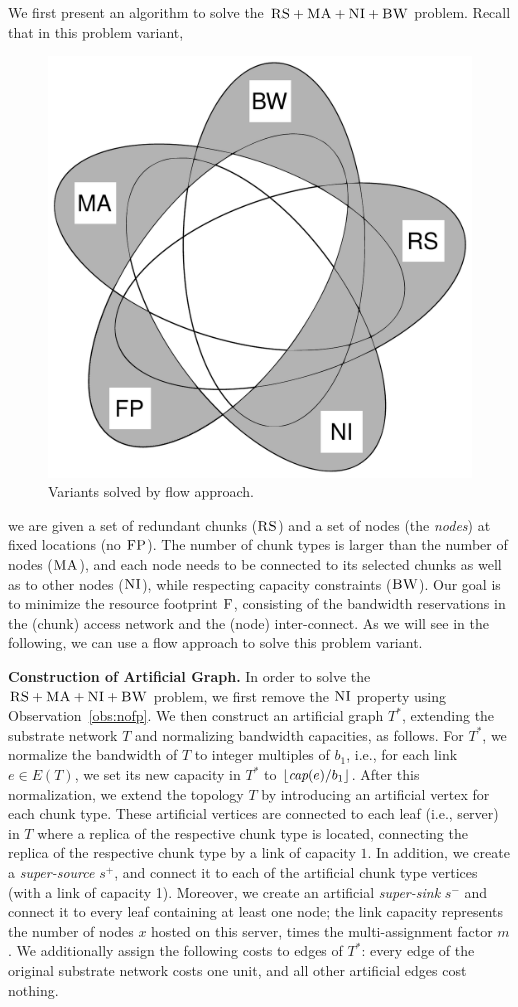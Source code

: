 \documentclass[conference,10pt]{IEEEtran}
\newcommand{\MaFactor}{m}
\newcommand{\Source}{\ensuremath{s^{+}}}
\newcommand{\Sink}{\ensuremath{s^{-}}}
\newcommand{\capacity}{\emph{cap}}
\newcommand{\CC}{\textsc{NI}}
\newcommand{\FP}{\textsc{FP}}
\newcommand{\RS}{\textsc{RS}}
\newcommand{\BW}{\textsc{BW}}
\newcommand{\MA}{\textsc{MA}}
\newcommand{\Cost}{\textsc{F}}
\newcommand{\Tree}{\ensuremath{T}}
\newcommand{\CostTrans}{\ensuremath{b_1}}
\begin{document}
We first present an algorithm to solve the $\RS+\MA+\CC+\BW$ problem.
Recall that in this problem variant,
\begin{figure}
\vspace{-1em}
\includegraphics[width=0.48\columnwidth]{figs/venn_flow.pdf}
\caption{Variants solved by flow approach.}
\vspace{-1em}
\label{fig:venn_flow}
\end{figure}
we are given a set of redundant chunks ($\RS$) and a set of
nodes
(the \emph{nodes})
at fixed locations (no $\FP$). The number of chunk types is larger than the number
of nodes ($\MA$), and each node needs to be connected
to its selected chunks as well as to other nodes ($\CC$), while respecting
capacity constraints ($\BW$).
Our goal is to minimize the resource footprint $\Cost$, consisting
of the bandwidth reservations in the (chunk) access network and the (node)
inter-connect.
As we will see in the following, we can use a flow approach to solve this
problem variant.




\textbf{Construction of Artificial Graph.}
In order to solve the $\RS+\MA+\CC+\BW$ problem,
we first remove the $\CC$ property using Observation~\ref{obs:nofp}.
We then construct
an artificial graph $\Tree^*$, extending the substrate network $\Tree$ and
normalizing bandwidth capacities, as follows. For $\Tree^*$,
we normalize the bandwidth of $\Tree$ to integer multiples of $\CostTrans$,
i.e., for each link $e\in E(\Tree)$, we set its new
capacity in $\Tree^*$ to $\lfloor\capacity(e)/\CostTrans\rfloor$.
After this normalization, we extend the topology $\Tree$ by
introducing an artificial vertex for each chunk type. These artificial
vertices are connected to each leaf (i.e., server) in $\Tree$ where a replica
 of the respective chunk type is located,
connecting the replica of the respective chunk type by a link of capacity $1$. In
addition, we create a
\emph{super-source} $\Source$, and connect it to each of the artificial chunk
type vertices (with a link of capacity 1). Moreover, we create an artificial \emph{super-sink} $\Sink$ and
connect it to every leaf containing at least one node; the link capacity represents
the number of nodes $x$ hosted on this server, times the multi-assignment factor
$\MaFactor$.
We additionally assign the following costs to edges of $\Tree^*$:
every edge of the original substrate network costs one unit, and all other artificial edges
cost nothing.
\end{document}
